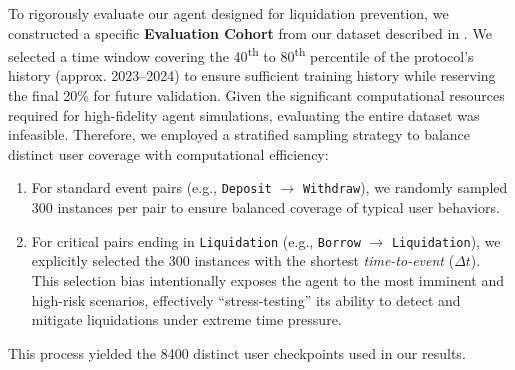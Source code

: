 \documentclass[manuscript,screen,review]{acmart}
\begin{document}
To rigorously evaluate our agent designed for liquidation prevention, we constructed a specific \textbf{Evaluation Cohort} from our dataset described in . We selected a time window covering the 40\textsuperscript{th} to 80\textsuperscript{th} percentile of the protocol's history (approx. 2023--2024) to ensure sufficient training history while reserving the final 20\% for future validation. Given the significant computational resources required for high-fidelity agent simulations, evaluating the entire dataset was infeasible. Therefore, we employed a stratified sampling strategy to balance distinct user coverage with computational efficiency:
\begin{enumerate}
    \item For standard event pairs (e.g., \texttt{Deposit} $\to$ \texttt{Withdraw}), we randomly sampled 300 instances per pair to ensure balanced coverage of typical user behaviors.
    \item For critical pairs ending in \texttt{Liquidation} (e.g., \texttt{Borrow} $\to$ \texttt{Liquidation}), we explicitly selected the 300 instances with the shortest \textit{time-to-event} ($\Delta t$). This selection bias intentionally exposes the agent to the most imminent and high-risk scenarios, effectively ``stress-testing'' its ability to detect and mitigate liquidations under extreme time pressure.
\end{enumerate}
This process yielded the 8400 distinct user checkpoints used in our results.
\end{document}
